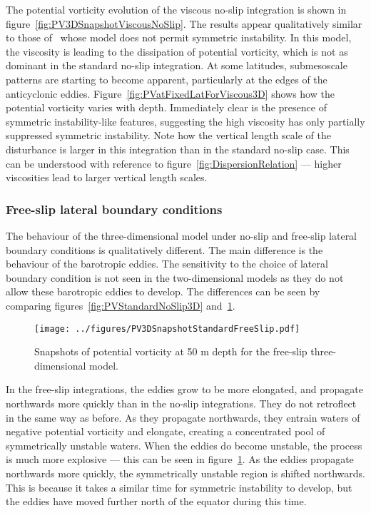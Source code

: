 The potential vorticity evolution of the viscous no-slip integration is shown in figure~\ref{fig:PV3DSnapshotViscousNoSlip}. The results appear qualitatively similar to those of~\citet{Edwards1998I} whose model does not permit symmetric instability. In this model, the viscosity is leading to the dissipation of potential vorticity, which is not as dominant in the standard no-slip integration. At some latitudes, submesoscale patterns are starting to become apparent, particularly at the edges of the anticyclonic eddies. Figure~\ref{fig:PVatFixedLatForViscous3D} shows how the potential vorticity varies with depth. Immediately clear is the presence of symmetric instability-like features, suggesting the high viscosity has only partially suppressed symmetric instability. Note how the vertical length scale of the disturbance is larger in this integration than in the standard no-slip case. This can be understood with reference to figure~\ref{fig:DispersionRelation} --- higher viscosities lead to larger vertical length scales.

\subsubsection{Free-slip lateral boundary conditions}
The behaviour of the three-dimensional model under no-slip and free-slip lateral boundary conditions is qualitatively different. The main difference is the behaviour of the barotropic eddies. The sensitivity to the choice of lateral boundary condition is not seen in the two-dimensional models as they do not allow these barotropic eddies to develop. The differences can be seen by comparing figures~\ref{fig:PVStandardNoSlip3D} and~\ref{fig:PV3DSnapshotStandardFreeSlip}.

\begin{figure}[p]
    \centering
    \texttt{[image: ../figures/PV3DSnapshotStandardFreeSlip.pdf]}
    \caption{Snapshots of potential vorticity at 50 m depth for the free-slip three-dimensional model.}
    \label{fig:PV3DSnapshotStandardFreeSlip}
\end{figure}

In the free-slip integrations, the eddies grow to be more elongated, and propagate northwards more quickly than in the no-slip integrations. They do not retroflect in the same way as before. As they propagate northwards, they entrain waters of negative potential vorticity and elongate, creating a concentrated pool of symmetrically unstable waters. When the eddies do become unstable, the process is much more explosive --- this can be seen in figure~\ref{fig:PV3DSnapshotStandardFreeSlip}. As the eddies propagate northwards more quickly, the symmetrically unstable region is shifted northwards. This is because it takes a similar time for symmetric instability to develop, but the eddies have moved further north of the equator during this time.

